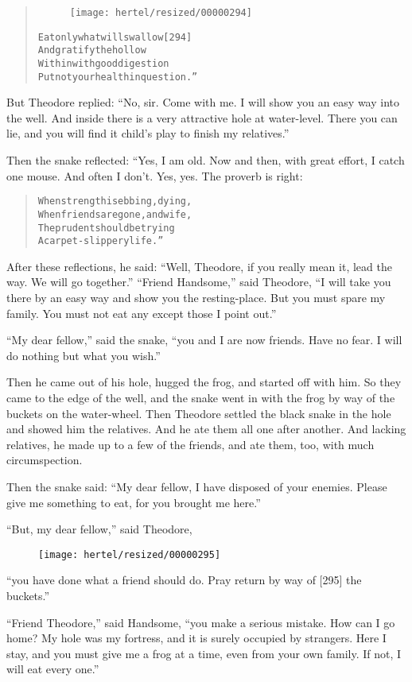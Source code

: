 \documentclass[article, twoside, 10pt]{memoir}
\renewenvironment{verbatim}{%
\begin{quote}%
\vskip -10pt%
\begin{alltt}\normalfont\small}{\end{alltt}%
\end{quote}%
\vskip -10pt
} %
\begin{document}
\begin{verbatim}
\begin{figure}[p]\texttt{[image: hertel/resized/00000294]}\end{figure}Eat only what will swallow                              [294]
And gratify the hollow
Within with good digestion{\textemdash}
Put not your health in question.”
\end{verbatim}
But Theodore replied:
``No, sir. Come with me. I will show you an easy way into the well. And inside there is a very attractive hole at water-level. There you can lie, and you will find it child's play to finish my relatives.''

Then the snake reflected: “Yes, I am old. Now and then, with great
effort, I catch one mouse. And often I don't. Yes, yes. The proverb
is right:

\begin{verbatim}
When strength is ebbing, dying,
    When friends are gone, and wife,
The prudent should be trying
    A carpet-slippery life.”
\end{verbatim}
After these reflections, he said:
``Well, Theodore, if you really mean it, lead the way. We will go together.''
``Friend Handsome,'' said Theodore,
``I will take you there by an easy way and show you the resting-place. But you must spare my family. You must not eat any except those I point out.''

``My dear fellow,'' said the snake,
``you and I are now friends. Have no fear. I will do nothing but what you wish.''

Then he came out of his hole, hugged the frog, and started off with
him. So they came to the edge of the well, and the snake went in
with the frog by way of the buckets on the water-wheel. Then
Theodore settled the black snake in the hole and showed him the
relatives. And he ate them all one after another. And lacking
relatives, he made up to a few of the friends, and ate them, too,
with much circumspection.

Then the snake said:
``My dear fellow, I have disposed of your enemies. Please give me something to eat, for you brought me here.''

``But, my dear fellow,'' said Theodore,
\begin{figure}[p]\texttt{[image: hertel/resized/00000295]}\end{figure}``you have done what a friend should do. Pray return by way of [295] the buckets.''

``Friend Theodore,'' said Handsome,
``you make a serious mistake. How can I go home? My hole was my fortress, and it is surely occupied by strangers. Here I stay, and you must give me a frog at a time, even from your own family. If not, I will eat every one.''
\end{document}
